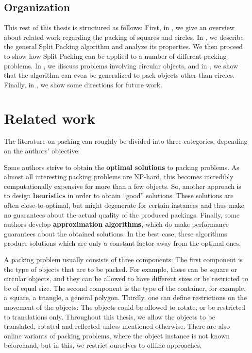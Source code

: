 \documentclass[a4paper,style=print,oneside,bibliography=totoc,nexus,lnum,extramargin]{tubsbook}
\begin{document}
\section{Organization}

This rest of this thesis is structured as follows:
First, in \textbf{}, we give an overview about related work regarding the packing of squares and circles.
In \textbf{}, we describe the general Split Packing algorithm and analyze its properties.
We then proceed to show how Split Packing can be applied to a number of different packing problems. In \textbf{}, we discuss problems involving circular objects, and in \textbf{}, we show that the algorithm can even be generalized to pack objects other than circles.
Finally, in \textbf{}, we show some directions for future work.

\chapter{Related work}\label{ch:related-work}

The literature on packing can roughly be divided into three categories, depending on the authors' objective:

Some authors strive to obtain the \textbf{optimal solutions} to packing problems. As almost all interesting packing problems are NP-hard, this becomes incredibly computationally expensive for more than a few objects.
So, another approach is to design \textbf{heuristics} in order to obtain “good” solutions. These solutions are often close-to-optimal, but might degenerate for certain instances and thus make no guarantees about the actual quality of the produced packings.
Finally, some authors develop \textbf{approximation algorithms}, which do make performance guarantees about the obtained solutions. In the best case, these algorithms produce solutions which are only a constant factor away from the optimal ones.

A packing problem usually consists of three components: The first component is the type of objects that are to be packed. For example, these can be square or circular objects, and they can be allowed to have different sizes or be restricted to be of equal size. The second component is the type of the container, for example, a square, a triangle, a general polygon. Thirdly, one can define restrictions on the movement of the objects: The objects could be allowed to rotate, or be restricted to translations only. Throughout this thesis, we allow the objects to be translated, rotated and reflected unless mentioned otherwise. There are also online variants of packing problems, where the object instance is not known beforehand, but in this, we restrict ourselves to offline approaches.
\end{document}
